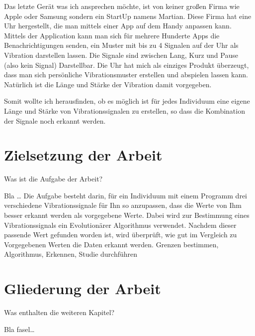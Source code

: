 Das letzte Gerät was ich ansprechen möchte, ist von keiner großen Firma wie Apple oder Samsung sondern ein StartUp namens Martian. Diese Firma hat eine Uhr hergestellt, die man mittels einer App auf dem Handy anpassen kann. Mittels der Application kann man sich für mehrere Hunderte Apps die Benachrichtigungen senden, ein Muster mit bis zu 4 Signalen auf der Uhr als Vibration darstellen lassen. Die Signale sind zwischen Lang, Kurz und Pause (also kein Signal) Darstellbar. 
Die Uhr hat mich als einziges Produkt überzeugt, dass man sich persönliche Vibrationsmuster erstellen und abspielen lassen kann. Natürlich ist die Länge und Stärke der Vibration damit vorgegeben.

Somit wollte ich herausfinden, ob es möglich ist für jedes Individuum eine eigene Länge und Stärke von Vibrationssignalen zu erstellen, so dass die Kombination der Signale noch erkannt werden.
 

\section{Zielsetzung der Arbeit}
\label{ch:Einleitung:sec:Zielsetzung}

Was ist die Aufgabe der Arbeit? 

Bla \ldots
Die Aufgabe besteht darin, für ein Individuum mit einem Programm drei verschiedene Vibrationssignale für Ihn so anzupassen, dass die Werte von Ihm besser erkannt werden als vorgegebene Werte. Dabei wird zur Bestimmung eines Vibrationssignals ein Evolutionärer Algorithmus verwendet. Nachdem dieser passende Wert gefunden worden ist, wird überprüft, wie gut im Vergleich zu Vorgegebenen Werten die Daten erkannt werden.
Grenzen bestimmen,
Algorithmus,
Erkennen,
Studie durchführen


\section{Gliederung der Arbeit}
\label{ch:Einleitung:sec:Gliederung}

Was enthalten die weiteren Kapitel?

Bla fasel\ldots

